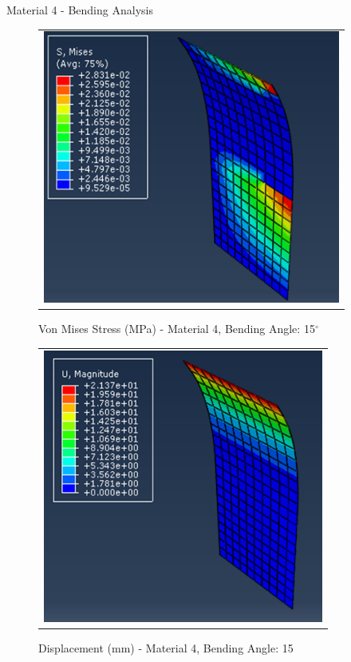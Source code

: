 \documentclass[a4paper,12pt]{article}
\numberwithin{equation}{section}
\numberwithin{figure}{section}
\begin{document}

\newpage
\noindent Material 4 - Bending Analysis 
\begin{figure}[H]
  \centering
  \begin{tabular}{@{}c@{}}
    \includegraphics[width=0.7\linewidth,height=255pt]{Results/Bending/M4_VMS_15.png} \\
  \end{tabular}
  \caption{Von Mises Stress (MPa) - Material 4,  Bending Angle: 15$^{\circ}$ }
\end{figure}

\begin{figure}[H]
  \centering
  \begin{tabular}{@{}c@{}}
    \includegraphics[width=0.7\linewidth,height=255pt]{Results/Bending/M4_DIS_15.png} \\
  \end{tabular}
  \caption{Displacement (mm) - Material 4, Bending Angle: 15}
\end{figure}
\end{document}
